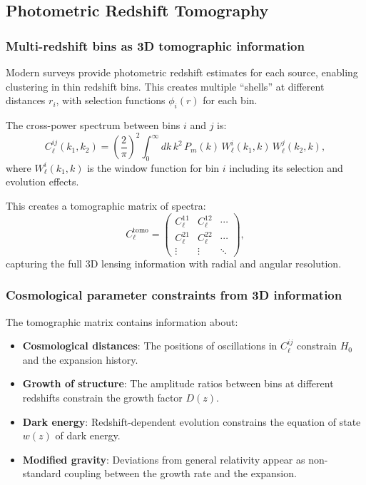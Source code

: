 \subsection{Photometric Redshift Tomography}

\subsubsection{Multi-redshift bins as 3D tomographic information}

Modern surveys provide photometric redshift estimates for each source, enabling clustering in thin redshift bins. This creates
multiple ``shells'' at different distances $r_i$, with selection functions $\phi_i(r)$ for each bin.

The cross-power spectrum between bins $i$ and $j$ is:
\begin{equation}
C_\ell^{ij}(k_1, k_2) = \left(\frac{2}{\pi}\right)^2 \int_0^\infty dk \, k^2 \, P_m(k) \,
W_\ell^i(k_1, k) \, W_\ell^j(k_2, k),
\label{eq:cross_power_tomographic}
\end{equation}
where $W_\ell^i(k_1, k)$ is the window function for bin $i$ including its selection and evolution effects.

This creates a tomographic matrix of spectra:
\begin{equation}
C_\ell^{\text{tomo}} = \begin{pmatrix}
C_\ell^{11} & C_\ell^{12} & \cdots \\
C_\ell^{21} & C_\ell^{22} & \cdots \\
\vdots & \vdots & \ddots
\end{pmatrix},
\label{eq:tomographic_matrix}
\end{equation}
capturing the full 3D lensing information with radial and angular resolution.

\subsubsection{Cosmological parameter constraints from 3D information}

The tomographic matrix contains information about:
\begin{itemize}
\item \textbf{Cosmological distances}: The positions of oscillations in $C_\ell^{ij}$ constrain $H_0$ and the expansion history.
\item \textbf{Growth of structure}: The amplitude ratios between bins at different redshifts constrain the growth factor $D(z)$.
\item \textbf{Dark energy}: Redshift-dependent evolution constrains the equation of state $w(z)$ of dark energy.
\item \textbf{Modified gravity}: Deviations from general relativity appear as non-standard coupling between the growth rate and the expansion.
\end{itemize}

